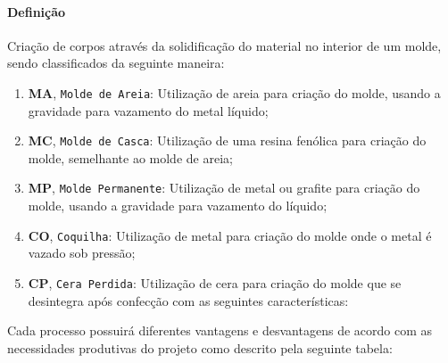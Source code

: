 \documentclass{article}
\begin{document}
            \paragraph{Definição}Criação de corpos através da solidificação do material no interior de um molde, sendo classificados da seguinte maneira:
                \begin{enumerate}[rightmargin = \leftmargin]
                    \item \textbf{MA}, \texttt{Molde de Areia}: Utilização de areia para criação do molde, usando a gravidade para vazamento do metal líquido;

                    \item \textbf{MC}, \texttt{Molde de Casca}: Utilização de uma resina fenólica para criação do molde, semelhante ao molde de areia;

                    \item \textbf{MP}, \texttt{Molde Permanente}: Utilização de metal ou grafite para criação do molde, usando a gravidade para vazamento do líquido;

                    \item \textbf{CO}, \texttt{Coquilha}: Utilização de metal para criação do molde onde o metal é vazado sob pressão;

                    \item \textbf{CP}, \texttt{Cera Perdida}: Utilização de cera para criação do molde que se desintegra após confecção com as seguintes características:
                \end{enumerate}
            Cada processo possuirá diferentes vantagens e desvantagens de acordo com as necessidades produtivas do projeto como descrito pela seguinte tabela:
\end{document}
